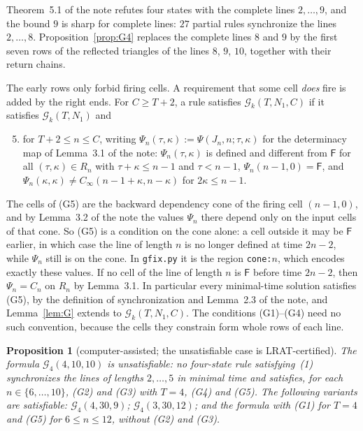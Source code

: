 \documentclass[11pt]{article}
\newtheorem{proposition}[theorem]{Proposition}
\theoremstyle{definition}
\theoremstyle{remark}
\newcommand{\Fq}{\mathsf F}
\begin{document}
Theorem~5.1 of the note refutes four states with the complete lines
$2,\dots,9$, and the bound $9$ is sharp for complete lines: $27$ partial rules
synchronize the lines $2,\dots,8$. Proposition~\ref{prop:G4} replaces the
complete lines $8$ and $9$ by the first seven rows of the reflected triangles
of the lines $8$, $9$, $10$, together with their return chains.

The early rows only forbid firing cells. A requirement that some cell
\emph{does} fire is added by the right ends. For $C\ge T+2$, a rule satisfies
$\mathcal G_k(T,N_1,C)$ if it satisfies $\mathcal G_k(T,N_1)$ and
\begin{enumerate}[(G1)]\setcounter{enumi}{4}
\item for $T+2\le n\le C$, writing $\Psi_n(\tau,\kappa):=\Psi(J_n,n;\tau,\kappa)$
for the determinacy map of Lemma~3.1 of the note: $\Psi_n(\tau,\kappa)$ is
defined and different from $\Fq$ for all $(\tau,\kappa)\in R_n$ with
$\tau+\kappa\le n-1$ and $\tau<n-1$, $\Psi_n(n-1,0)=\Fq$, and
$\Psi_n(\kappa,\kappa)\ne C_\infty(n-1+\kappa,n-\kappa)$ for $2\kappa\le n-1$.
\end{enumerate}
The cells of (G5) are the backward dependency cone of the firing cell
$(n-1,0)$, and by Lemma~3.2 of the note the values $\Psi_n$ there depend only
on the input cells of that cone. So (G5) is a condition on the cone alone: a
cell outside it may be $\Fq$ earlier, in which case the line of length $n$ is
no longer defined at time $2n-2$, while $\Psi_n$ still is on the cone. In
\texttt{gfix.py} it is the region \texttt{cone:$n$}, which encodes exactly
these values. If no cell of the line of length $n$ is $\Fq$ before time
$2n-2$, then $\Psi_n=C_n$ on $R_n$ by Lemma~3.1. In particular every
minimal-time solution satisfies (G5), by the definition of synchronization
and Lemma~2.3 of the note, and Lemma~\ref{lem:G} extends to $\mathcal
G_k(T,N_1,C)$. The conditions (G1)--(G4) need no such convention, because
the cells they constrain form whole rows of each line.

\begin{proposition}[computer-assisted; the unsatisfiable case is
LRAT-certified]\label{prop:G4cone}
The formula $\mathcal G_4(4,10,10)$ is unsatisfiable: no four-state rule
satisfying~(1) synchronizes the lines of lengths $2,\dots,5$ in minimal time
and satisfies, for each $n\in\{6,\dots,10\}$, (G2) and (G3) with $T=4$, (G4)
and (G5). The following variants are satisfiable: $\mathcal G_4(4,30,9)$;
$\mathcal G_4(3,30,12)$; and the formula with (G1) for $T=4$ and (G5) for
$6\le n\le12$, without (G2) and (G3).
\end{proposition}
\end{document}
